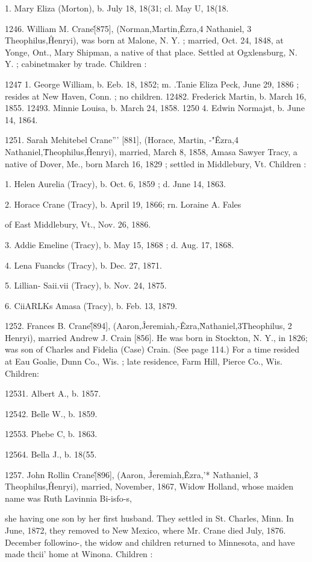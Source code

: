 \documentclass{book}
\begin{document}
1. Mary Eliza (Morton), b. July 18, 18(31; cl. May U, 18(18. 

1246. William M. Crane\^ [875], (Norman,\^ Martin,\^ Ezra,4 
Nathaniel, 3 Theophilus,\^ Henryi), was born at Malone, N. Y. ; 
married, Oct. 24, 1848, at Yonge, Ont., Mary Shipman, a native 
of that place. Settled at Ogxlensburg, N. Y. ; cabinetmaker by 
trade. Children : 

1247  1. George William, b. Eeb. 18, 1852; m. .Tanie Eliza Peck, 
June 29, 1886 ; resides at New Haven, Conn. ; no children. 
12482. Frederick Martin, b. March 16, 1855. 
12493. Minnie Louisa, b. March 24, 1858. 
1250  4. Edwin Normajst, b. June 14, 1864. 

1251. Sarah Mehitebel Crane''' [881], (Horace, \^ Martin, -"\^ 
Ezra,4 Nathaniel,\^ Theophilus,\^ Henryi), married, March 8, 1858, 
Amasa Sawyer Tracy, a native of Dover, Me., born March 16, 
1829 ; settled in Middlebury, Vt. Children : 

1. Helen Aurelia (Tracy), b. Oct. 6, 1859 ; d. Jnne 14, 1863. 

2. Horace Crane (Tracy), b. April 19, 1866; rn. Loraine A. Fales 

of East Middlebury, Vt., Nov. 26, 1886. 

3. Addie Emeline (Tracy), b. May 15, 1868 ; d. Aug. 17, 1868. 

4. Lena Fuancks (Tracy), b. Dec. 27, 1871. 

5. Lillian- Saii.vii (Tracy), b. Nov. 24, 1875. 

6. CiiARLKs Amasa (Tracy), b. Feb. 13, 1879. 

1252. Frances B. Crane\^ [894], (Aaron,\^ Jeremiah,-\^ Ezra,\^ 
Nathaniel,3Theophilus, 2 Henryi), married Andrew J. Crain [856]. 
He was born in Stockton, N. Y., in 1826; was son of Charles 
and Fidelia (Case) Crain. (See page 114.) For a time resided 
at Eau Goalie, Dunn Co., Wis. ; late residence, Farm Hill, Pierce 
Co., Wis. Children: 

12531. Albert A., b. 1857. 

12542. Belle W., b. 1859. 

12553. Phebe C, b. 1863. 

12564. Bella J., b. 18(55. 

1257. John Rollin Crane\^ [896], (Aaron, \^ Jeremiah,\^ Ezra,'* 
Nathaniel, 3 Theophilus,\^ Henryi), married, November, 1867, 
Widow Holland, whose maiden name was Ruth Lavinnia Bi-isfo-s, 




she having one son by her first husband. They settled in St. 
Charles, Minn. In June, 1872, they removed to New Mexico, 
where Mr. Crane died July, 1876. December followino-, the 
widow and children returned to Minnesota, and have made thcii' 
home at Winona. Children : 
\end{document}
